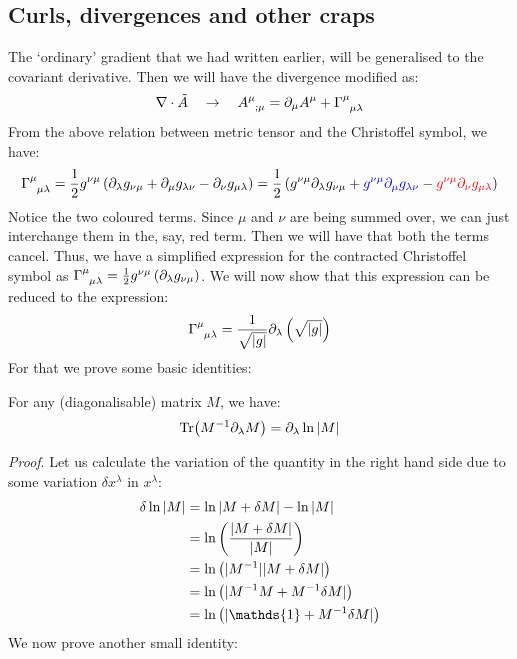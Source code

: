\subsection{Curls, divergences and other craps}
The `ordinary' gradient that we had written earlier, will be generalised to the covariant derivative. Then we will have the divergence modified as: 
\begin{align*}
    \nabla \cdot \tilde{A}\quad \rightarrow \quad \tensor{A}{^\mu _{; \mu}} = \partial_\mu A^\mu + \tensor{\Gamma}{^\mu _{\mu \lambda}}
\end{align*}
From the above relation between metric tensor and the Christoffel symbol, we have:
\begin{align*}
    \tensor{\Gamma}{^\mu _{\mu \lambda}} = \frac{1}{2}g^{\nu \mu}\brac{\partial_\lambda g_{\nu \mu}+\partial_\mu g_{\lambda \nu}-\partial_\nu g_{\mu \lambda}} = \frac{1}{2}\brac{{g^{\nu \mu}\partial_\lambda g_{\nu \mu}}+\mathcolor{blue}{g^{\nu \mu}\partial_\mu g_{\lambda \nu}}-\mathcolor{red}{g^{\nu \mu}\partial_\nu g_{\mu \lambda}}}
\end{align*}
Notice the two coloured terms. Since $\mu$ and $\nu$ are being summed over, we can just interchange them in the, say, red term. Then we will have that both the terms cancel. Thus, we have a simplified expression for the contracted Christoffel symbol as $\tensor{\Gamma}{^\mu _{\mu \lambda}} = \frac{1}{2}g^{\nu \mu}\brac{\partial_\lambda g_{\nu \mu}}$. We will now show that this expression can be reduced to the expression:
$$\tensor{\Gamma}{^\mu _{\mu \lambda}} = \frac{1}{\sqrt{|g|}}\partial_\lambda \brac{\sqrt{|g|}}$$
For that we prove some basic identities:
\begin{identity}
    For any (diagonalisable) matrix $M$, we have:
    $$\Tr (M^{-1}\partial_\lambda M) = \partial_\lambda \ln |M|$$
\end{identity}
\textit{Proof}. Let us calculate the variation of the quantity in the right hand side due to some variation $\delta x^\lambda$ in $x^\lambda$:
\begin{align*}
    \delta \ln |M| &= \ln |M+\delta M| - \ln |M| \\
    &= \ln \brac{\frac{|M+\delta M|}{|M|}} \\
    &= \ln \brac{|M^{-1}||M+\delta M|}\\
    &=\ln \brac{|M^{-1}M + M^{-1}\delta M|}\\
    &=\ln \brac{|\mathds{1}+  M^{-1}\delta M|}
\end{align*}
We now prove another small identity:
